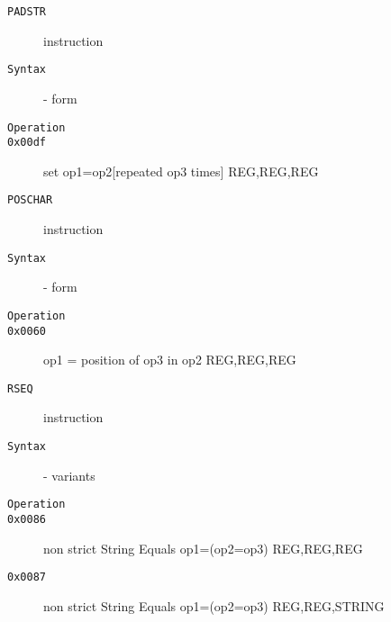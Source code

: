 \clearpage
\begin{description}
\item[\texttt{PADSTR}] instruction\\
\item[\texttt{Syntax}] - form \\

\item[\texttt{Operation}]
\item[\texttt{}]
\item[\texttt{0x00df}] set op1=op2[repeated op3 times]  {REG,REG,REG}       \\
\end{description}
\clearpage
\begin{description}
\item[\texttt{POSCHAR}] instruction\\
\item[\texttt{Syntax}] - form \\

\item[\texttt{Operation}]
\item[\texttt{}]
\item[\texttt{0x0060}] op1 = position of op3 in op2  {REG,REG,REG}       \\
\end{description}
\clearpage
\begin{description}
\item[\texttt{RSEQ}] instruction\\
\item[\texttt{Syntax}] - variants\\

\item[\texttt{Operation}]
\item[\texttt{}]
\item[\texttt{0x0086}] non strict String Equals op1=(op2=op3)  {REG,REG,REG}       \\
\item[\texttt{0x0087}] non strict String Equals op1=(op2=op3)  {REG,REG,STRING}    \\
\end{description}
